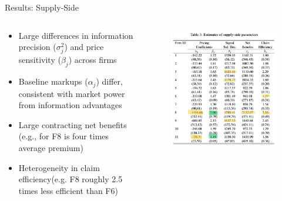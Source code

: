 \documentclass[10pt,aspectratio=169]{beamer}
\begin{document}
\begin{frame}{Results: Supply-Side}

\begin{columns}[t]
\begin{column}{0.44\textwidth}


\begin{itemize}
  \item Large differences in information precision  ($\sigma_j^2$) and price sensitivity ($\beta_j$) across firms
    
  \item Baseline markups ($\alpha_j$) differ, consistent with market power from information advantages
  
  
  \item Large contracting net benefits (e.g., for F8 is four times average premium)
  \item Heterogeneity in claim efficiency(e.g. F8 roughly 2.5 times less efficient than F6)
\end{itemize}
\end{column}

\begin{column}{0.51\textwidth}
\vspace{-0.3cm}
\begin{figure}[H]
\centering
\includegraphics[width=\textwidth]{Figures/Tab3_hihglighted.png}
\end{figure}
\end{column}
\end{columns}

\end{frame}
\end{document}
